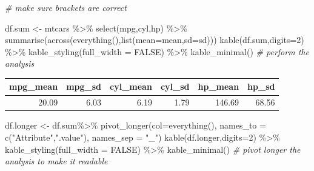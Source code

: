 \documentclass[
]{article}
\newenvironment{Shaded}{\begin{snugshade}}{\end{snugshade}}
\newcommand{\AttributeTok}[1]{\textcolor[rgb]{0.77,0.63,0.00}{#1}}
\newcommand{\CommentTok}[1]{\textcolor[rgb]{0.56,0.35,0.01}{\textit{#1}}}
\newcommand{\ConstantTok}[1]{\textcolor[rgb]{0.00,0.00,0.00}{#1}}
\newcommand{\DecValTok}[1]{\textcolor[rgb]{0.00,0.00,0.81}{#1}}
\newcommand{\FunctionTok}[1]{\textcolor[rgb]{0.00,0.00,0.00}{#1}}
\newcommand{\NormalTok}[1]{#1}
\newcommand{\OtherTok}[1]{\textcolor[rgb]{0.56,0.35,0.01}{#1}}
\newcommand{\SpecialCharTok}[1]{\textcolor[rgb]{0.00,0.00,0.00}{#1}}
\newcommand{\StringTok}[1]{\textcolor[rgb]{0.31,0.60,0.02}{#1}}
\begin{document}
\begin{Shaded}
\begin{Highlighting}[]
\CommentTok{\# make sure brackets are correct}

\NormalTok{df.sum }\OtherTok{\textless{}{-}}\NormalTok{ mtcars }\SpecialCharTok{\%\textgreater{}\%}  \FunctionTok{select}\NormalTok{(mpg,cyl,hp) }\SpecialCharTok{\%\textgreater{}\%}
  \FunctionTok{summarise}\NormalTok{(}\FunctionTok{across}\NormalTok{(}\FunctionTok{everything}\NormalTok{(),}\FunctionTok{list}\NormalTok{(}\AttributeTok{mean=}\NormalTok{mean,}\AttributeTok{sd=}\NormalTok{sd)))}
\FunctionTok{kable}\NormalTok{(df.sum,}\AttributeTok{digits=}\DecValTok{2}\NormalTok{) }\SpecialCharTok{\%\textgreater{}\%} \FunctionTok{kable\_styling}\NormalTok{(}\AttributeTok{full\_width =} \ConstantTok{FALSE}\NormalTok{) }\SpecialCharTok{\%\textgreater{}\%}
  \FunctionTok{kable\_minimal}\NormalTok{() }\CommentTok{\# perform the analysis}
\end{Highlighting}
\end{Shaded}

\begin{table}
\centering
\begin{tabular}{r|r|r|r|r|r}
\hline
mpg\_mean & mpg\_sd & cyl\_mean & cyl\_sd & hp\_mean & hp\_sd\\
\hline
20.09 & 6.03 & 6.19 & 1.79 & 146.69 & 68.56\\
\hline
\end{tabular}
\end{table}

\begin{Shaded}
\begin{Highlighting}[]
\NormalTok{df.longer }\OtherTok{\textless{}{-}}\NormalTok{ df.sum}\SpecialCharTok{\%\textgreater{}\%} \FunctionTok{pivot\_longer}\NormalTok{(}\AttributeTok{col=}\FunctionTok{everything}\NormalTok{(),  }
\AttributeTok{names\_to =} \FunctionTok{c}\NormalTok{(}\StringTok{"Attribute"}\NormalTok{,}\StringTok{".value"}\NormalTok{),}
  \AttributeTok{names\_sep =} \StringTok{"\_"}\NormalTok{)}
\FunctionTok{kable}\NormalTok{(df.longer,}\AttributeTok{digits=}\DecValTok{2}\NormalTok{) }\SpecialCharTok{\%\textgreater{}\%}
  \FunctionTok{kable\_styling}\NormalTok{(}\AttributeTok{full\_width =} \ConstantTok{FALSE}\NormalTok{) }\SpecialCharTok{\%\textgreater{}\%}
  \FunctionTok{kable\_minimal}\NormalTok{() }\CommentTok{\# pivot longer the analysis to make it readable}
\end{Highlighting}
\end{Shaded}
\end{document}
